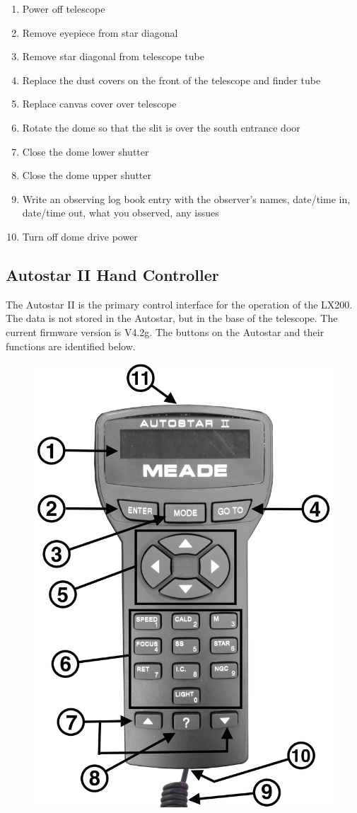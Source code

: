 \documentclass[12pt,titlepage]{article}
\begin{document}
\begin{enumerate}
	\label{enum:quickshutdown_start}
	\item Power off telescope
	\item Remove eyepiece from star diagonal
	\item Remove star diagonal from telescope tube
	\item Replace the dust covers on the front of the telescope and finder tube
	\item Replace canvas cover over telescope
	\item Rotate the dome so that the slit is over the south entrance door
	\item Close the dome lower shutter
	\item Close the dome upper shutter
	\item Write an observing log book entry with the observer's names, date/time in, date/time out, what you observed, any issues
	\item Turn off dome drive power
	\label{enum:quickshutdown_end}
\end{enumerate}


\subsection{Autostar II Hand Controller}
The Autostar II is the primary control interface for the operation of the LX200.
The data is not stored in the Autostar, but in the base of the telescope.
The current firmware version is V4.2g.
The buttons on the Autostar and their functions are identified below.

\begin{figure}[H]
	\begin{center}
		\includegraphics[width=.6\textwidth]{./images/lx200/autostar/controller_labeled.jpg}
	\end{center}
\end{figure}
\end{document}
